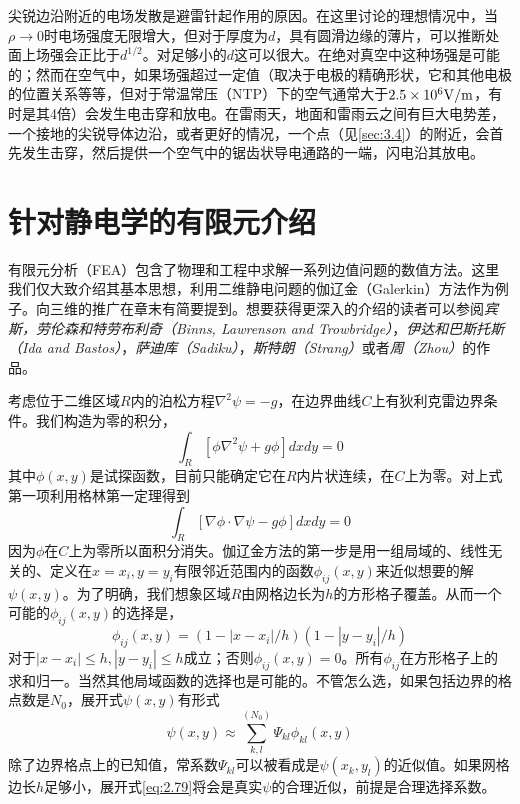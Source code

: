 \documentclass[12pt]{book}
\numberwithin{equation}{chapter}
\numberwithin{figure}{chapter}
\numberwithin{footnote}{page}
\begin{document}
尖锐边沿附近的电场发散是避雷针起作用的原因。在这里讨论的理想情况中，当$\rho\to0$时电场强度无限增大，但对于厚度为$d$，具有圆滑边缘的薄片，可以推断处面上场强会正比于$d^{1/2}$。对足够小的$d$这可以很大。在绝对真空中这种场强是可能的；然而在空气中，如果场强超过一定值（取决于电极的精确形状，它和其他电极的位置关系等等，但对于常温常压（NTP）下的空气通常大于$2.5\times 10^6{\rm V/m}$，有时是其4倍）会发生电击穿和放电。在雷雨天，地面和雷雨云之间有巨大电势差，一个接地的尖锐导体边沿，或者更好的情况，一个点（见\autoref{sec:3.4}）的附近，会首先发生击穿，然后提供一个空气中的锯齿状导电通路的一端，闪电沿其放电。

\section{针对静电学的有限元介绍}\label{sec:2.12}

有限元分析（FEA）包含了物理和工程中求解一系列边值问题的数值方法。这里我们仅大致介绍其基本思想，利用二维静电问题的伽辽金（Galerkin）方法作为例子。向三维的推广在章末有简要提到。想要获得更深入的介绍的读者可以参阅\textit{宾斯，劳伦森和特劳布利奇（Binns, Lawrenson and Trowbridge）}，\textit{伊达和巴斯托斯（Ida and Bastos）}，\textit{萨迪库（Sadiku）}，\textit{斯特朗（Strang）}或者\textit{周（Zhou）}的作品。

考虑位于二维区域$R$内的泊松方程$\nabla^2\psi=-g$，在边界曲线$C$上有狄利克雷边界条件。我们构造为零的积分，
\begin{equation}\label{eq:2.76}
    \int_R [\phi\nabla^2\psi+g\phi]dxdy=0
\end{equation}
其中$\phi(x,y)$是试探函数，目前只能确定它在$R$内片状连续，在$C$上为零。对上式第一项利用格林第一定理得到
\begin{equation}\label{eq:2.77}
    \int_R [\nabla\phi\cdot\nabla\psi-g\phi]dxdy=0
\end{equation}
因为$\phi$在$C$上为零所以面积分消失。伽辽金方法的第一步是用一组局域的、线性无关的、定义在$x=x_i,y=y_i$有限邻近范围内的函数$\phi_{ij}(x,y)$来近似想要的解$\psi(x,y)$。为了明确，我们想象区域$R$由网格边长为$h$的方形格子覆盖。从而一个可能的$\phi_{ij}(x,y)$的选择是，
\begin{equation}\label{eq:2.78}
    \phi_{ij}(x,y)=(1-|x-x_i|/h)(1-|y-y_i|/h)
\end{equation}
对于$|x-x_i|\leq h, |y-y_i|\leq h$成立；否则$\phi_{ij}(x,y)=0$。所有$\phi_{ij}$在方形格子上的求和归一。当然其他局域函数的选择也是可能的。不管怎么选，如果包括边界的格点数是$N_0$，展开式$\psi(x,y)$有形式
\begin{equation}\label{eq:2.79}
    \psi(x,y)\approx \sum_{k,l}^{(N_0)} \Psi_{kl}\phi_{kl}(x,y)
\end{equation}
除了边界格点上的已知值，常系数$\Psi_{kl}$可以被看成是$\psi(x_k,y_l)$的近似值。如果网格边长$h$足够小，展开式\autoref{eq:2.79}将会是真实$\psi$的合理近似，前提是合理选择系数。
\end{document}
